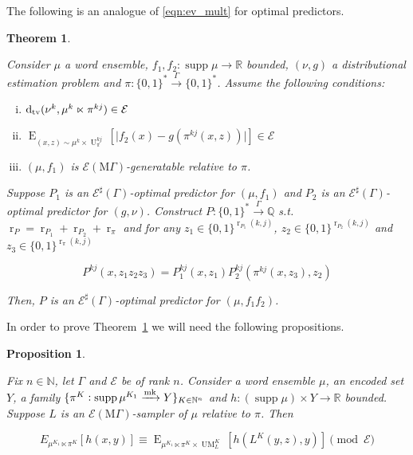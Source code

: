 \documentclass{article}
\numberwithin{equation}{section}
\theoremstyle{definition}
\theoremstyle{plain}
\newtheorem{theorem}{Theorem}[section]
\newtheorem{proposition}{Proposition}[section]
\newcommand{\Bool}{\{0,1\}}
\newcommand{\Words}{{\Bool^*}}
\newcommand{\WordsLen}[1]{{\Bool^{#1}}}
\DeclareMathOperator{\Supp}{supp}
\DeclareMathOperator{\E}{E}
\DeclareMathOperator{\R}{r}
\DeclareMathOperator{\UM}{UM}
\DeclareMathOperator{\U}{U}
\newcommand{\Dtv}{\operatorname{d}_{\textnormal{tv}}}
\newcommand{\Nats}{\mathbb{N}}
\newcommand{\Rats}{\mathbb{Q}}
\newcommand{\Reals}{\mathbb{R}}
\newcommand{\Abs}[1]{\lvert #1 \rvert}
\newcommand{\MGrow}{\mathrm{M}\Gamma}
\newcommand{\Fall}{\mathcal{E}}
\newcommand{\Markov}{\xrightarrow{\textnormal{mk}}}
\newcommand{\Scheme}{\xrightarrow{\Gamma}}
\begin{document}
The following is an analogue of \ref{eqn:ev_mult} for optimal predictors.

\begin{samepage}
\begin{theorem}
\label{thm:mult}

Consider $\mu$ a word ensemble, $f_1, f_2: \Supp \mu \rightarrow \Reals$ bounded, $(\nu,g)$ a distributional estimation problem and $\pi: \Words \Scheme \Words$. Assume the following conditions:

\begin{enumerate}[(i)]

\item $\Dtv(\nu^k,\mu^k \ltimes \pi^{kj}) \in \Fall$

\item $\E_{(x,z) \sim \mu^k \times \U_\pi^{kj}}[\Abs{f_2(x)-g(\pi^{kj}(x,z))}] \in \Fall$

\item $(\mu, f_1)$ is $\Fall(\MGrow)$-generatable relative to $\pi$.

\end{enumerate}

Suppose $P_1$ is an $\Fall^\sharp(\Gamma)$-optimal predictor for $(\mu,f_1)$ and $P_2$ is an $\Fall^\sharp(\Gamma)$-optimal predictor for $(g,\nu)$. Construct $P: \Words \Scheme \Rats$ s.t. $\R_P=\R_{P_1}+\R_{P_2}+\R_{\pi}$ and for any $z_1 \in \WordsLen{\R_{P_1}(k,j)}$, $z_2 \in \WordsLen{\R_{P_2}(k,j)}$ and $z_3 \in \WordsLen{\R_\pi(k,j)}$

\begin{equation}
P^{kj}(x,z_1 z_2 z_3)=P_1^{kj}(x,z_1) P_2^{kj}(\pi^{kj}(x,z_3),z_2)
\end{equation}

Then, $P$ is an $\Fall^\sharp(\Gamma)$-optimal predictor for $(\mu,f_1 f_2)$.

\end{theorem}
\end{samepage}

In order to prove Theorem~\ref{thm:mult} we will need the following propositions.

\begin{samepage}
\begin{proposition}
\label{prp:smp}

Fix $n \in \Nats$, let $\Gamma$ and $\Fall$ be of rank $n$. Consider a word ensemble $\mu$, an encoded set $Y$, a family $\{\pi^K: \Supp \mu^{K_1} \Markov Y\}_{K \in \Nats^n}$ and ${h: (\Supp \mu) \times Y \rightarrow \Reals}$ bounded. Suppose $L$ is an $\Fall(\MGrow)$-sampler of $\mu$ relative to $\pi$. Then

\begin{equation}
E_{\mu^{K_1} \ltimes \pi^K}[h(x,y)] \equiv \E_{\mu^{K_1} \ltimes \pi^K \times \UM_L^K}[h(L^K(y,z),y)] \pmod \Fall
\end{equation}

\end{proposition}
\end{samepage}
\end{document}
